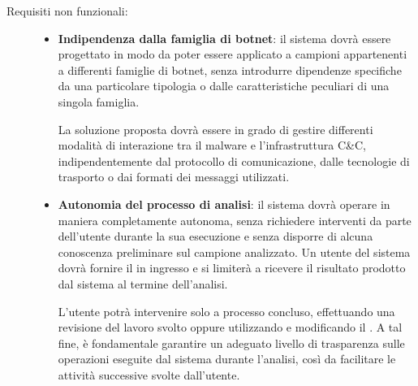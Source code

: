 \begin{description}
    \item[Requisiti non funzionali:] \hspace{1em}
    
    \begin{itemize}
        \item \textbf{Indipendenza dalla famiglia di botnet}: il sistema dovrà essere progettato in modo da poter essere applicato a campioni appartenenti a differenti famiglie di botnet, senza introdurre dipendenze specifiche da una particolare tipologia o dalle caratteristiche peculiari di una singola famiglia.


        La soluzione proposta dovrà essere in grado di gestire differenti modalità di interazione tra il malware e l'infrastruttura C\&C, indipendentemente dal protocollo di comunicazione, dalle tecnologie di trasporto o dai formati dei messaggi utilizzati.

        \item \textbf{Autonomia del processo di analisi}: il sistema dovrà operare in maniera completamente autonoma, senza richiedere interventi da parte dell'utente durante la sua esecuzione e senza disporre di alcuna conoscenza preliminare sul campione analizzato. Un utente del sistema dovrà fornire il \binary{} in ingresso e si limiterà a ricevere il risultato prodotto dal sistema al termine dell'analisi. %
        

        L'utente potrà intervenire solo a processo concluso, effettuando una revisione del lavoro svolto oppure utilizzando e modificando il \capture{}. A tal fine, è fondamentale garantire un adeguato livello di trasparenza sulle operazioni eseguite dal sistema durante l'analisi, così da facilitare le attività successive svolte dall'utente.



\end{itemize}
\end{description}
